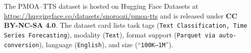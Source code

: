 
The PMOA–TTS dataset is hosted on Hugging Face Datasets at \url{https://huggingface.co/datasets/snoroozi/pmoa-tts} and is released under \textbf{CC BY-NC-SA 4.0}. The dataset card lists task tags (\texttt{Text Classification, Time Series Forecasting}), modality (\texttt{Text}), format support (\texttt{Parquet via auto-conversion}), language (\texttt{English}), and size (“\texttt{100K–1M}”).



